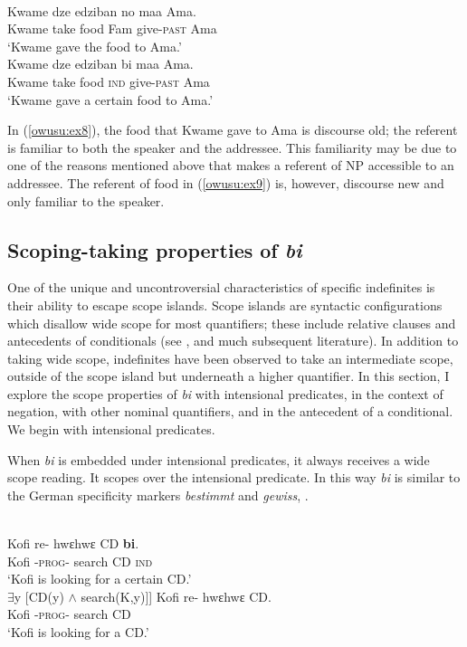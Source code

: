 \documentclass[output=paper,modfonts,nonflat,draftmode]{langsci/langscibook}
\begin{document}
\ea {}\\
\ea\label{owusu:ex8}
\gll  Kwame dze edziban no maa Ama.\\
   Kwame take food Fam give-\textsc{past} Ama \\ 
\glt `Kwame gave the food to Ama.'\\

\ex\label{owusu:ex9} 
\gll Kwame dze edziban bi maa Ama.\\
   Kwame take food \textsc{ind} give-\textsc{past} Ama \\ 
\glt `Kwame gave a certain food to Ama.'\\
\z \z 

In (\ref{owusu:ex8}), the food that Kwame gave to Ama is discourse old; the referent is familiar to both the speaker and the addressee. This familiarity may be due to one of the reasons mentioned above that makes a referent of NP accessible to an addressee. The referent of food in (\ref{owusu:ex9}) is, however, discourse new and only familiar to the speaker.
	 
\subsection{Scoping-taking properties of \emph{bi}}
One of the unique and uncontroversial characteristics of specific indefinites is their ability to escape scope islands. Scope islands are syntactic configurations which disallow wide scope for most quantifiers; these include relative clauses and antecedents of conditionals (see \citealt{FodorSag1982}, and much subsequent literature). In addition to taking wide scope, indefinites have been observed to take an intermediate scope, outside of the scope island but underneath a higher quantifier. In this section, I explore the scope properties of \emph{bi} with intensional predicates, in the context of negation, with other nominal quantifiers, and in the antecedent of a conditional. We begin with intensional predicates.

   When \emph{bi} is embedded under intensional predicates, it always receives a wide scope reading. It scopes over the intensional predicate. In this way \emph{bi} is similar to the German specificity markers \emph{bestimmt} and \emph{gewiss}, \citep{EbertEtAl2012}.
   
 \ea 
 \\
 \ea \label{006}
\gll Kofi re- hwεhwε CD \textbf{bi}.\\
    Kofi -\textsc{prog}-  search CD \textsc{ind}\\
\glt `Kofi is looking for a certain CD.'\\
$\exists$y [CD(y) $\wedge$ search(K,y)]]
\ex\label{006b}
\gll Kofi re- hwεhwε CD.\\
 Kofi -\textsc{prog}-  search CD  \\
\glt `Kofi is looking for a CD.'
\z \z 
\end{document}

